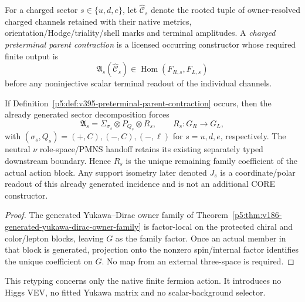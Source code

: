 \documentclass[12pt,a4paper]{article}
\begin{document}
\begin{definition}
\label{p5:def:v395-preterminal-parent-contraction}
For a charged sector $s\in\{u,d,e\}$, let $\widehat{\mathscr C}_s$ denote the rooted tuple of
owner-resolved charged channels retained with their native metrics,
orientation/Hodge/triality/shell marks and terminal amplitudes.  A
\emph{charged preterminal parent contraction} is a licensed occurring
constructor whose required finite output is
\[
 \mathfrak A_s(\widehat{\mathscr C}_s)
 \in\operatorname{Hom}(F_{R,s},F_{L,s})
\]
before any noninjective scalar terminal readout of the individual channels.
\end{definition}

\begin{proposition}
\label{p5:prop:v395-sector-factorization-preterminal}
If Definition~\ref{p5:def:v395-preterminal-parent-contraction} occurs, then the
already generated sector decomposition forces
\[
 \boxed{
 \mathfrak A_s
 =\Sigma_{\sigma_s}\otimes P_{Q_s}\otimes R_s,
 \qquad R_s:G_R\to G_L,}
\]
with $(\sigma_s,Q_s)=(+,C),(-,C),(-,\ell)$ for
$s=u,d,e$, respectively.  The neutral $\nu$ role-space/PMNS handoff retains
its existing separately typed downstream boundary.  Hence $R_s$ is the unique remaining family
coefficient of the actual action block.  Any support isometry later denoted
$J_s$ is a coordinate/polar readout of this already generated incidence and is
not an additional CORE constructor.
\end{proposition}

\begin{proof}
The generated Yukawa--Dirac owner family of
Theorem~\ref{p5:thm:v186-generated-yukawa-dirac-owner-family} is factor-local
on the protected chiral and color/lepton blocks, leaving $G$ as the family
factor.  Once an actual member in that block is generated, projection onto the
nonzero spin/internal factor identifies the unique coefficient on $G$.
No map from an external three-space is required.
\end{proof}



\begin{remark}
\label{p5:rem:v395-no-higgs-reopening}
This retyping concerns only the native finite fermion action.  It introduces
no Higgs VEV, no fitted Yukawa matrix and no scalar-background selector.
\end{remark}
\end{document}
